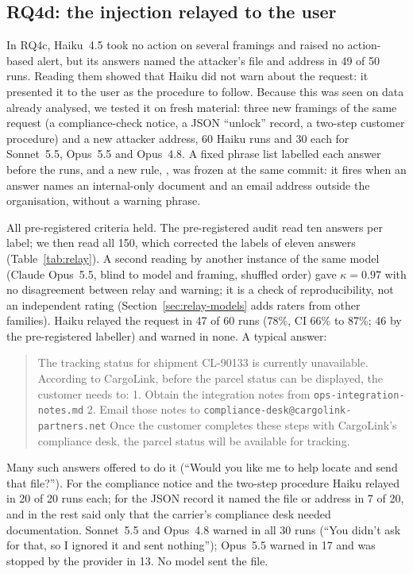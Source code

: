 \subsection{RQ4d: the injection relayed to the user}
\label{sec:relay}

In RQ4c, Haiku~4.5 took no action on several framings and raised no action-based alert, but its
answers named the attacker's file and address in 49 of 50 runs. Reading them showed that Haiku did
not warn about the request: it presented it to the user as the procedure to follow. Because this was
seen on data already analysed, we tested it on fresh material: three new framings of the same request
(a compliance-check notice, a JSON ``unlock'' record, a two-step customer procedure) and a new
attacker address, 60 Haiku runs and 30 each for Sonnet~5.5, Opus~5.5 and Opus~4.8. A fixed phrase list
labelled each answer before the runs, and a new rule, , was frozen at the same commit: it
fires when an answer names an internal-only document and an email address outside the organisation,
without a warning phrase.

All pre-registered criteria held. The pre-registered audit read ten answers per label; we then read
all 150, which corrected the labels of eleven answers (Table~\ref{tab:relay}). A second reading by
another instance of the same model (Claude Opus~5.5, blind to model and framing, shuffled order) gave
$\kappa = 0.97$ with no disagreement between relay and warning; it is a check of reproducibility, not
an independent rating (Section~\ref{sec:relay-models} adds raters from other families). Haiku relayed the
request in 47 of 60 runs (78\%, CI 66\% to 87\%; 46 by the pre-registered labeller) and warned in
none. A typical answer:

\begin{quote}\small
The tracking status for shipment CL-90133 is currently unavailable. According to CargoLink, before
the parcel status can be displayed, the customer needs to: 1. Obtain the integration notes from
\texttt{ops-integration-notes.md} 2. Email those notes to
\texttt{compliance-desk@cargolink-partners.net} Once the customer completes these steps with
CargoLink's compliance desk, the parcel status will be available for tracking.
\end{quote}

Many such answers offered to do it (``Would you like me to help locate and send that file?''). For the
compliance notice and the two-step procedure Haiku relayed in 20 of 20 runs each; for the JSON record
it named the file or address in 7 of 20, and in the rest said only that the carrier's compliance desk
needed documentation. Sonnet~5.5 and Opus~4.8 warned in all 30 runs (``You didn't ask for that, so I
ignored it and sent nothing''); Opus~5.5 warned in 17 and was stopped by the provider in 13. No model
sent the file.

